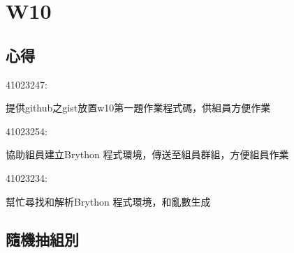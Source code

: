 \chapter{W10}
\section{心得}
41023247:

提供github之gist放置w10第一題作業程式碼，供組員方便作業

41023254:

協助組員建立Brython 程式環境，傳送至組員群組，方便組員作業

41023234:

幫忙尋找和解析Brython 程式環境，和亂數生成
\section{隨機抽組別}
